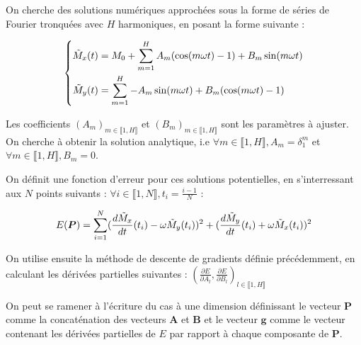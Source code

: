 \documentclass[12pt]{report}
\begin{document}
On cherche des solutions numériques approchées sous la forme de séries de Fourier tronquées avec $H$ harmoniques, en posant la forme suivante :

\begin{equation}
    \left\{
    \begin{aligned}
        \Tilde{M}_x(t) & = M_0 + \sum_{m=1}^{H} A_m (\cos(m\omega t)-1) + B_m \sin(m\omega t) \\
        \Tilde{M}_y(t) & = \sum_{m=1}^{H} -A_m \sin(m\omega t) + B_m (\cos(m\omega t)-1)
    \end{aligned}
    \right.
    \label{eq:solution_fourier_couplee_2D}
\end{equation}

Les coefficients $(A_m)_{m\in \llbracket 1,H \rrbracket}$ et $(B_m)_{m\in \llbracket 1,H \rrbracket}$ sont les paramètres à ajuster.
On cherche à obtenir la solution analytique, i.e $\forall m \in\llbracket 1,H \rrbracket, A_m = \delta _1 ^m $ et $\forall m \in\llbracket 1,H \rrbracket, B_m = 0 $.

On définit une fonction d'erreur pour ces solutions potentielles, en s'interressant aux $N$ points suivants : $\forall i \in\llbracket 1,N \rrbracket, t_i = \frac{i-1}{N} $ :

\begin{equation}
    E(\bm{P}) = \sum_{i=1}^{N} (\frac{d\Tilde{M}_x}{dt}(t_i) - \omega \Tilde{M}_y(t_i))^2 + (\frac{d\Tilde{M}_y}{dt}(t_i) + \omega \Tilde{M}_x(t_i))^2
    \label{eq:erreur_descente_gradient_couplees}
\end{equation}

On utilise ensuite la méthode de descente de gradients définie précédemment, en calculant les dérivées partielles suivantes :
$(\frac{\partial E}{\partial A_l}, \frac{\partial E}{\partial B_l})_{l \in \llbracket 1,H \rrbracket}$

On peut se ramener à l'écriture du cas à une dimension définissant le vecteur $\bm{P}$ comme la concaténation des vecteurs $\bm{A}$ et $\bm{B}$ et le vecteur $\bm{g}$ comme le vecteur contenant les dérivées partielles de $E$ par rapport à chaque composante de $\bm{P}$.
\end{document}
